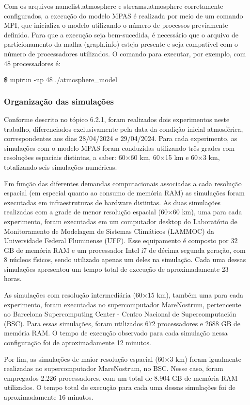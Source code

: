 \documentclass[12pt,a4paper,oneside]{book}
\begin{document}
Com os arquivos namelist.atmosphere e streams.atmosphere corretamente configurados, a execução do modelo MPAS é realizada por meio de um comando MPI, que inicializa o modelo utilizando o número de processos previamente definido. Para que a execução seja bem-sucedida, é necessário que o arquivo de particionamento da malha (graph.info) esteja presente e seja compatível com o número de processadores utilizados. O comando para executar, por exemplo, com 48 processadores é:

\textbf{\$} mpirun -np 48 ./atmosphere\_model

\subsubsection{Organização das simulações}

Conforme descrito no tópico 6.2.1, foram realizados dois experimentos neste trabalho, diferenciados exclusivamente pela data da condição inicial atmosférica, correspondentes aos dias 28/04/2024 e 29/04/2024. Para cada experimento, as simulações com o modelo MPAS foram conduzidas utilizando três grades com resoluções espaciais distintas, a saber: 60$\times$60 km, 60$\times$15 km e 60$\times$3 km, totalizando seis simulações numéricas.

Em função das diferentes demandas computacionais associadas a cada resolução espacial (em especial quanto ao consumo de memória RAM) as simulações foram executadas em infraestruturas de hardware distintas. As duas simulações realizadas com a grade de menor resolução espacial (60$\times$60 km), uma para cada experimento, foram executadas em um computador desktop do Laboratório de Monitoramento de Modelagem de Sistemas Climáticos (LAMMOC) da Universidade Federal Fluminense (UFF). Esse equipamento é composto por 32 GB de memória RAM e um processador Intel i7 de décima segunda geração, com 8 núcleos físicos, sendo utilizado apenas um deles na simulação. Cada uma dessas simulações apresentou um tempo total de execução de aproximadamente 23 horas.

As simulações com resolução intermediária (60$\times$15 km), também uma para cada experimento, foram executadas no supercomputador MareNostrum, pertencente ao Barcelona Supercomputing Center - Centro Nacional de Supercomputación (BSC). Para essas simulações, foram utilizados 672 processadores e 2688 GB de memória RAM. O tempo de execução observado para cada simulação nessa configuração foi de aproximadamente 12 minutos.

Por fim, as simulações de maior resolução espacial (60$\times$3 km) foram igualmente realizadas no supercomputador MareNostrum, no BSC. Nesse caso, foram empregados 2.226 processadores, com um total de 8.904 GB de memória RAM utilizados. O tempo total de execução para cada uma dessas simulações foi de aproximadamente 16 minutos.
\end{document}
